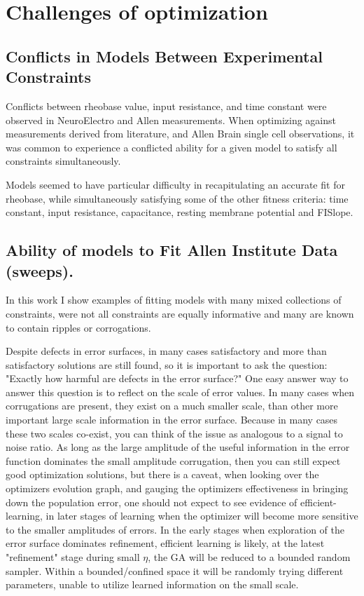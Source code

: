 \section{Challenges of optimization}
\subsection{Conflicts in Models Between Experimental Constraints}

Conflicts between rheobase value, input resistance, and time constant  were observed in NeuroElectro and Allen measurements. When optimizing against measurements derived from literature, and Allen Brain single cell observations, it was common to experience a conflicted ability for a given model to satisfy all constraints simultaneously. 

Models seemed to have particular difficulty in recapitulating an accurate fit for rheobase, while simultaneously satisfying some of the other fitness criteria: time constant, input resistance, capacitance, resting membrane potential and FISlope. 


\subsection{Ability of models to Fit Allen Institute Data (sweeps).}

In this work I show examples of fitting models with many mixed collections of constraints, were not all constraints are equally informative and many are known to contain ripples or corrogations.

Despite defects in error surfaces, in many cases satisfactory and more than satisfactory solutions are still found, so it is important to ask the question: "Exactly how harmful are defects in the error surface?" One easy answer way to answer this question is to reflect on the scale of error values. In many cases when corrugations are present, they exist on a much smaller scale, than other more important large scale information in the error surface. Because in many cases these two scales co-exist, you can think of the issue as analogous to a signal to noise ratio. As long as the large amplitude of the useful information in the error function dominates the small amplitude corrugation, then you can still expect good optimization solutions, but there is a caveat, when looking over the optimizers evolution graph, and gauging the optimizers effectiveness in bringing down the population error, one should not expect to see evidence of efficient-learning, in later stages of learning when the optimizer will become more sensitive to the smaller amplitudes of errors. In the early stages when exploration of the error surface dominates refinement, efficient learning is likely, at the latest "refinement" stage during small $\eta$, the GA will be reduced to a bounded random sampler. Within a bounded/confined space it will be randomly trying different parameters, unable to utilize learned information on the small scale.


